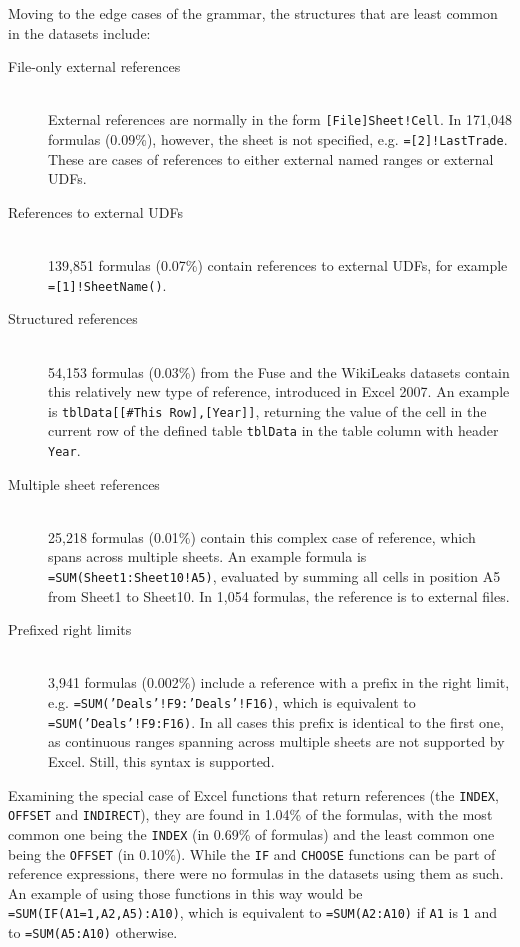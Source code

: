 \documentclass[times]{smrauth}
\begin{document}
Moving to the edge cases of the grammar, the structures that are least common in the datasets include:
\begin{description}
	\item[File-only external references] \hfill \\
	External references are normally in the form \texttt{[File]Sheet!Cell}. In 171,048 formulas (0.09\%), however, the sheet is not specified, e.g. \texttt{=[2]!LastTrade}. These are cases of references to either external named ranges or external UDFs.
	\item[References to external UDFs] \hfill \\
	139,851 formulas (0.07\%) contain references to external UDFs, for example \texttt{=[1]!SheetName()}.
	\item[Structured references] \hfill \\
	54,153 formulas (0.03\%) from the Fuse and the WikiLeaks datasets contain this relatively new type of reference, introduced in Excel 2007. An example is \texttt{tblData[[\#This Row],[Year]]}, returning the value of the cell in the current row of the defined table \texttt{tblData} in the table column with header \texttt{Year}.
	\item[Multiple sheet references] \hfill \\
	25,218 formulas (0.01\%) contain this complex case of reference, which spans across multiple sheets. An example formula is \texttt{=SUM(Sheet1:Sheet10!A5)}, evaluated by summing all cells in position A5 from Sheet1 to Sheet10. In 1,054 formulas, the reference is to external files.
	\item[Prefixed right limits] \hfill \\
	3,941 formulas (0.002\%) include a reference with a prefix in the right limit, e.g. \texttt{=SUM('Deals'!F9:'Deals'!F16)}, which is equivalent to \texttt{=SUM('Deals'!F9:F16)}. In all cases this prefix is identical to the first one, as continuous ranges spanning across multiple sheets are not supported by Excel. Still, this syntax is supported.
\end{description}

Examining the special case of Excel functions that return references (the \texttt{INDEX}, \texttt{OFFSET} and \texttt{INDIRECT}), they are found in 1.04\% of the formulas, with the most common one being the \texttt{INDEX} (in 0.69\% of formulas) and the least common one being the \texttt{OFFSET} (in 0.10\%).
While the \texttt{IF} and \texttt{CHOOSE} functions can be part of reference expressions, there were no formulas in the datasets using them as such.
An example of using those functions in this way would be \texttt{=SUM(IF(A1=1,A2,A5):A10)}, which is equivalent to \texttt{=SUM(A2:A10)} if \texttt{A1} is \texttt{1} and to \texttt{=SUM(A5:A10)} otherwise.
\end{document}
